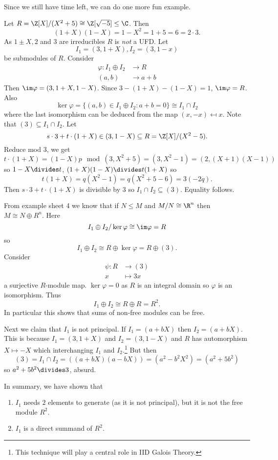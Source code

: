 \documentclass[a4paper]{article}
\begin{document}
Since we still have time left, we can do one more fun example.

\begin{eg}
  Let \(R = \Z[X]/(X^2 + 5) \cong \Z[\sqrt{-5}] \leq \C\). Then
  \[
    (1 + X)(1 - X) = 1 - X^2 = 1 + 5 = 6 = 2 \cdot 3.
  \]
  As \(1 \pm X, 2\) and \(3\) are irreducibles \(R\) is \emph{not} a UFD. Let
  \[
    I_1 = (3, 1 + X), I_2 = (3, 1 - x)
  \]
  be submodules of \(R\). Consider
  \begin{align*}
    \varphi: I_1 \oplus I_2 &\to R \\
    (a, b) &\to a + b
  \end{align*}
  Then \(\im \varphi = (3, 1 + X, 1 - X)\). Since \(3 - (1 + X) - (1 - X) = 1\), \(\im \varphi = R\). Also
  \[
    \ker \varphi = \{(a, b) \in I_1 \oplus I_2 : a + b = 0\} \cong I_1 \cap I_2
  \]
  where the last isomorphism can be deduced from the map \((x, -x) \mapsfrom x\). Note that \((3) \subseteq I_1 \cap I_2\). Let
  \[
    s \cdot 3 + t \cdot (1 + X) \in (3, 1 - X) \subseteq R = \Z[X]/(X^2 - 5).
  \]
  Reduce mod \(3\), we get
  \[
    t \cdot (1 + X) = (1 - X)p \mod (3, X^2 + 5) = (3, X^2 - 1) = (2, (X + 1)(X - 1))
  \]
  so \(1 - X \divides t\), \((1 + X)(1 - X) \divides t(1 + X)\) so
  \[
    t(1 + X) = q(X^2 - 1) = q(X^2 + 5 -6) = 3(-2q).
  \]
  Then \(s \cdot 3 + t \cdot (1 + X)\) is divisible by \(3\) so \(I_1 \cap I_2 \subseteq (3)\). Equality follows.

  From example sheet 4 we know that if \(N \leq M\) and \(M/N \cong \R^n\) then \(M \cong N \oplus R^n\). Here
  \[
    I_1 \oplus I_2/\ker \varphi \cong \im \varphi = R
  \]
  so
  \[
    I_1 \oplus I_2 \cong R \oplus \ker \varphi = R \oplus (3).
  \]
  Consider
  \begin{align*}
    \psi: R &\to (3) \\
    x &\mapsto 3x
  \end{align*}
  a surjective \(R\)-module map. \(\ker \varphi = 0\) as \(R\) is an integral domain so \(\varphi\) is an isomorphism. Thus
  \[
    I_1 \oplus I_2 \cong R \oplus R = R^2.
  \]
  In particular this shows that sums of non-free modules can be free.

  Next we claim that \(I_1\) is not principal. If \(I_1 = (a + bX)\) then \(I_2 = (a + bX)\). This is because \(I_1 = (3, 1 + X)\) and \(I_2 = (3, 1 - X)\) and \(R\) has automorphism \(X \mapsto -X\) which interchanging \(I_1\) and \(I_2\).\footnote{This technique will play a central role in IID Galois Theory.} But then
  \[
    (3) = I_1 \cap I_2 = ((a + bX)(a - bX)) = (a^2 - b^2X^2) = (a^2 + 5b^2)
  \]
  so \(a^2 + 5b^2 \divides 3\), absurd.

  In summary, we have shown that
  \begin{enumerate}
  \item \(I_1\) needs \(2\) elements to generate (as it is not principal), but it is not the free module \(R^2\).
  \item \(I_1\) is a direct summand of \(R^2\).
  \end{enumerate}
\end{eg}

\printindex
\end{document}
